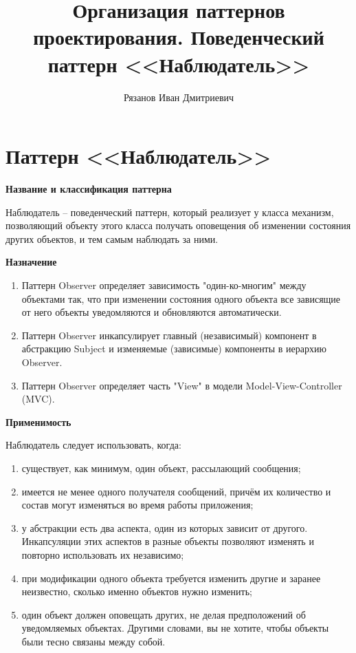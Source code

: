 \documentclass[PI,LAB]{HSEUniversity}
\title{Организация паттернов проектирования. Поведенческий паттерн <<Наблюдатель>>}
\author{Рязанов Иван Дмитриевич}
\begin{document}
\maketitle
\chapter{Паттерн <<Наблюдатель>>}
\textbf{Название и классификация паттерна}

Наблюдатель – поведенческий паттерн, который реализует у класса механизм, позволяющий объекту этого класса получать оповещения об изменении состояния других объектов, и тем самым наблюдать за ними.

\textbf{Назначение}


\begin{enumerate}
  \item Паттерн Observer определяет зависимость "один-ко-многим" между объектами так, что при изменении состояния одного объекта все зависящие от него объекты уведомляются и обновляются автоматически. 
  \item Паттерн Observer инкапсулирует главный (независимый) компонент в абстракцию Subject и изменяемые (зависимые) компоненты в иерархию Observer. 
  \item Паттерн Observer определяет часть "View" в модели Model-View-Controller (MVC).   
\end{enumerate}

\textbf{Применимость}

Наблюдатель следует использовать, когда:
\begin{enumerate}
  \item существует, как минимум, один объект, рассылающий сообщения;
  \item имеется не менее одного получателя сообщений, причём их количество и состав могут изменяться во время работы приложения; 
  \item у абстракции есть два аспекта, один из которых зависит от другого. Инкапсуляции этих аспектов в разные объекты позволяют изменять и повторно использовать их независимо;
  \item при модификации одного объекта требуется изменить другие и заранее неизвестно, сколько именно объектов нужно изменить;
  \item один объект должен оповещать других, не делая предположений об уведомляемых объектах. Другими словами, вы не хотите, чтобы объекты были тесно связаны между собой.
\end{enumerate}
\end{document}
